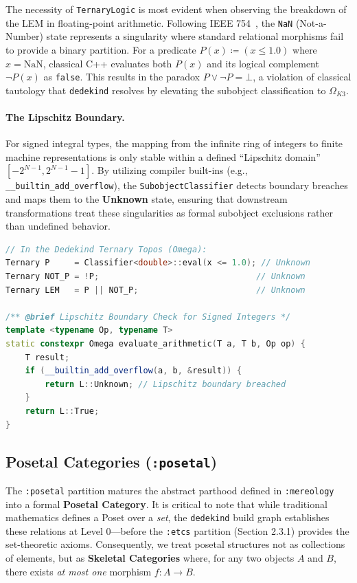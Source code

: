 \documentclass[11pt, a4paper]{report}
\begin{document}
The necessity of \texttt{TernaryLogic} is most evident when observing the breakdown of the LEM in floating-point arithmetic. Following IEEE 754~\cite{ieee754_2019}, the \texttt{NaN} (Not-a-Number) state represents a singularity where standard relational morphisms fail to provide a binary partition. For a predicate $P(x) \coloneqq (x \leq 1.0)$ where $x = \text{NaN}$, classical C++ evaluates both $P(x)$ and its logical complement $\neg P(x)$ as \texttt{false}. This results in the paradox $P \lor \neg P = \bot$, a violation of classical tautology that \texttt{dedekind} resolves by elevating the subobject classification to $\Omega_{K3}$.

\paragraph{The Lipschitz Boundary.} For signed integral types, the mapping from the infinite ring of integers to finite machine representations is only stable within a defined ``Lipschitz domain'' $[-2^{N-1}, 2^{N-1}-1]$. By utilizing compiler built-ins (e.g., \texttt{\_\_builtin\_add\_overflow}), the \texttt{SubobjectClassifier} detects boundary breaches and maps them to the \textbf{Unknown} state, ensuring that downstream transformations treat these singularities as formal subobject exclusions rather than undefined behavior.

\begin{lstlisting}[language=C++, caption={The NaN Truth-Hole and Lipschitz Boundary.}, label={lst:lipschitz_classifier}]
// In the Dedekind Ternary Topos (Omega):
Ternary P     = Classifier<double>::eval(x <= 1.0); // Unknown
Ternary NOT_P = !P;                                // Unknown
Ternary LEM   = P || NOT_P;                        // Unknown

/** @brief Lipschitz Boundary Check for Signed Integers */
template <typename Op, typename T>
static constexpr Omega evaluate_arithmetic(T a, T b, Op op) {
    T result;
    if (__builtin_add_overflow(a, b, &result)) {
        return L::Unknown; // Lipschitz boundary breached
    }
    return L::True; 
}
\end{lstlisting}



\subsection{Posetal Categories (\texttt{:posetal})}

The \texttt{:posetal} partition matures the abstract parthood defined in \texttt{:mereology} into a formal \textbf{Posetal Category}. It is critical to note that while traditional mathematics defines a Poset over a \textit{set}, the \texttt{dedekind} build graph establishes these relations at Level 0—before the \texttt{:etcs} partition (Section 2.3.1) provides the set-theoretic axioms. Consequently, we treat posetal structures not as collections of elements, but as \textbf{Skeletal Categories} where, for any two objects $A$ and $B$, there exists \textit{at most one} morphism $f: A \to B$.
\end{document}
